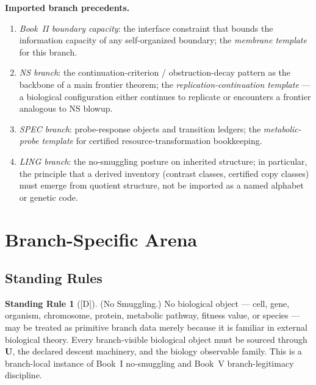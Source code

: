 \documentclass[12pt,oneside]{amsbook}
\theoremstyle{plain}
\theoremstyle{definition}
\newtheorem{standingrule}[theorem]{Standing Rule}
\theoremstyle{remark}
\newcommand{\status}[1]{\textup{[#1]}}
\begin{document}
\textbf{Imported branch precedents.}
\begin{enumerate}[label=\textup{(\arabic*)}]
 \item \emph{Book~II boundary capacity}: the interface constraint that
 bounds the information capacity of any self-organized boundary;
 the \emph{membrane template} for this branch.
 \item \emph{NS branch}: the continuation-criterion / obstruction-decay
 pattern as the backbone of a main frontier theorem; the
 \emph{replication-continuation template} --- a biological
 configuration either continues to replicate or encounters a
 frontier analogous to NS blowup.
 \item \emph{SPEC branch}: probe-response objects and transition
 ledgers; the \emph{metabolic-probe template} for certified
 resource-transformation bookkeeping.
 \item \emph{LING branch}: the no-smuggling posture on inherited
 structure; in particular, the principle that a derived inventory
 (contrast classes, certified copy classes) must emerge from
 quotient structure, not be imported as a named alphabet or genetic
 code.
\end{enumerate}

\section{Branch-Specific Arena}\label{sec:bio-arena}

\subsection{Standing Rules}\label{sec:bio-standing-rules}

\begin{standingrule}[\status{D}]\label{sr:bio-no-smuggling}
\textup{(No Smuggling.)}
No biological object --- cell, gene, organism, chromosome, protein,
metabolic pathway, fitness value, or species --- may be treated as
primitive branch data merely because it is familiar in external
biological theory. Every branch-visible biological object must be
sourced through $\mathbf{U}$, the declared descent machinery, and the
biology observable family. This is a branch-local instance of
Book~I no-smuggling and Book~V branch-legitimacy discipline.
\end{standingrule}
\end{document}
